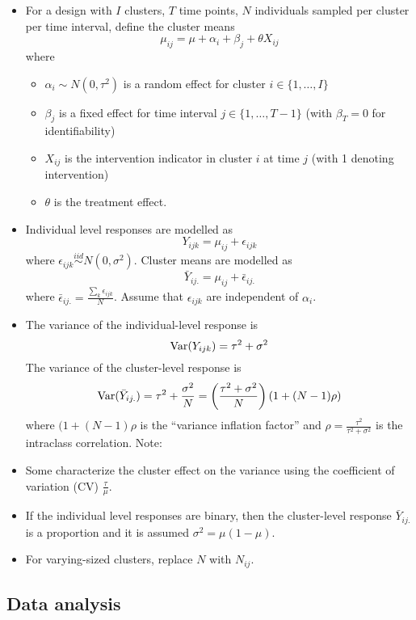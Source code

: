 \documentclass[10pt]{article}
\begin{document}
\begin{itemize}

\item
For a design with $I$ clusters, $T$ time points, $N$ individuals sampled per cluster per time interval, define the cluster means
\[
\mu_{ij} = \mu + \alpha_i + \beta_j + \theta X_{ij}
\]
where
\begin{itemize}
\item
$\alpha_i\sim N(0,\tau^2)$ is a random effect for cluster $i\in \{1,\ldots,I\}$
\item
$\beta_j$ is a fixed effect for time interval $j\in \{1,\ldots,T-1\}$ (with $\beta_T=0$ for identifiability)
\item
$X_{ij}$ is the intervention indicator in cluster $i$ at time $j$ (with 1 denoting intervention)
\item
$\theta$ is the treatment effect.
\end{itemize}

\item
Individual level responses are modelled as
\[
Y_{ijk} = \mu_{ij} + \epsilon_{ijk}
\]
where $\epsilon_{ijk}\overset{iid}{\sim} N(0,\sigma^2)$. Cluster means are modelled as
\[
\bar{Y}_{ij.} = \mu_{ij} + \bar{\epsilon}_{ij.}
\]
where $\bar{\epsilon}_{ij.} = \frac{\sum_k\epsilon_{ijk}}{N}$. Assume that $\epsilon_{ijk}$ are independent of $\alpha_i$.

\item
The variance of the individual-level response is
\[
\mathrm{Var}(Y_{ijk}) = \tau^2 + \sigma^2
\]
The variance of the cluster-level response is
\[
\mathrm{Var}(\bar{Y}_{ij.}) = \tau^2 + \frac{\sigma^2}{N} = \left(\frac{\tau^2+\sigma^2}{N}\right)(1+(N-1)\rho)
\]
where $(1+(N-1)\rho$ is the ``variance inflation factor'' and $\rho=\frac{\tau^2}{\tau^2+\sigma^2}$ is the intraclass correlation. Note:

\item
Some characterize the cluster effect on the variance using the coefficient of variation (CV) $\frac{\tau}{\mu}$.

\item
If the individual level responses are binary, then the cluster-level response $\bar{Y}_{ij.}$ is a proportion and it is assumed $\sigma^2=\mu(1-\mu)$.

\item
For varying-sized clusters, replace $N$ with $N_{ij}$.

\end{itemize}

\subsection{Data analysis}
\end{document}
